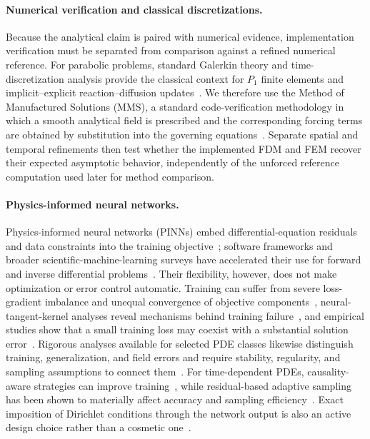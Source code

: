 \paragraph{Numerical verification and classical discretizations.}
Because the analytical claim is paired with numerical evidence, implementation verification must be separated from comparison against a refined numerical reference. For parabolic problems, standard Galerkin theory and time-discretization analysis provide the classical context for $P_1$ finite elements and implicit--explicit reaction--diffusion updates~\cite{thomee2006galerkin,hundsdorfer2003adr}. We therefore use the Method of Manufactured Solutions (MMS), a standard code-verification methodology in which a smooth analytical field is prescribed and the corresponding forcing terms are obtained by substitution into the governing equations~\cite{roache2002mms,oberkampf2010vv}. Separate spatial and temporal refinements then test whether the implemented FDM and FEM recover their expected asymptotic behavior, independently of the unforced reference computation used later for method comparison.

\paragraph{Physics-informed neural networks.}
Physics-informed neural networks (PINNs) embed differential-equation residuals and data constraints into the training objective~\cite{raissi2019physics}; software frameworks and broader scientific-machine-learning surveys have accelerated their use for forward and inverse differential problems~\cite{lu2021deepxde,cuomo2022sciml}. Their flexibility, however, does not make optimization or error control automatic. Training can suffer from severe loss-gradient imbalance and unequal convergence of objective components~\cite{wang2021gradient}, neural-tangent-kernel analyses reveal mechanisms behind training failure~\cite{wang2022ntk}, and empirical studies show that a small training loss may coexist with a substantial solution error~\cite{krishnapriyan2021failure}. Rigorous analyses available for selected PDE classes likewise distinguish training, generalization, and field errors and require stability, regularity, and sampling assumptions to connect them~\cite{deryck2022error,mishra2023generalization,deryck2024numerical}. For time-dependent PDEs, causality-aware strategies can improve training~\cite{wang2024causality}, while residual-based adaptive sampling has been shown to materially affect accuracy and sampling efficiency~\cite{wu2023sampling}. Exact imposition of Dirichlet conditions through the network output is also an active design choice rather than a cosmetic one~\cite{berrone2023dirichlet}.

